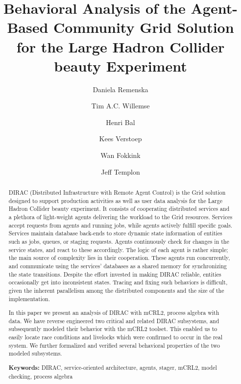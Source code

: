 \documentclass[10pt,conference]{IEEEtran}
\begin{document}
\title{Behavioral Analysis of the Agent-Based Community Grid Solution for the Large Hadron Collider beauty Experiment}
\author[1,3]{Daniela Remenska}
\author[2]{Tim A.C. Willemse}
\author[1]{Henri Bal}
\author[1]{Kees Verstoep}
\author[1]{Wan Fokkink}
\author[3]{Jeff Templon}


\maketitle

\begin{abstract}
DIRAC (Distributed Infrastructure with Remote Agent Control) is the Grid
solution designed to support production activities as well as user data analysis
for the Large Hadron Collider beauty experiment. It consists of cooperating
distributed services and a plethora of light-weight agents delivering the
workload to the Grid resources.  Services accept requests from agents and
running jobs, while agents actively fulfill specific goals. Services maintain
database back-ends to store dynamic state information of entities such as jobs,
queues, or staging requests. Agents continuously check for changes in the
service states, and react to these accordingly. The logic of each agent is
rather simple; the main source of complexity lies in their cooperation. These
agents run concurrently, and communicate using the services' databases as a
shared memory for synchronizing the state transitions. Despite the effort
invested in making DIRAC reliable, entities occasionally get into inconsistent
states. Tracing and fixing such behaviors is difficult, given the inherent
parallelism among the distributed components and the size of the
implementation.

In this paper we present an analysis of DIRAC with mCRL2, process algebra with
data. We have reverse engineered two critical and related DIRAC subsystems, and
subsequently modeled their behavior with the mCRL2 toolset. This enabled us to
easily locate race conditions and livelocks which were confirmed to occur in the
real system. We further formalized and verified several behavioral properties of
the two modeled subsystems.

\textbf{Keywords:} DIRAC, service-oriented architecture, agents, stager,
mCRL2,  model checking,  process algebra

\end{abstract}
\end{document}
